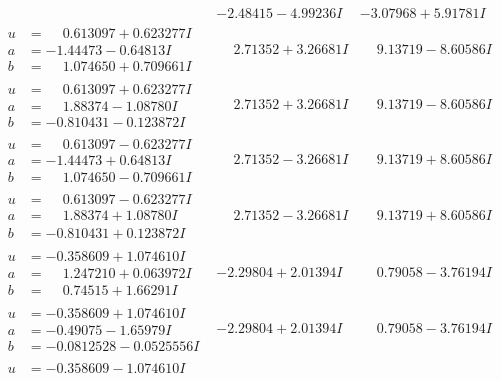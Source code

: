 \documentclass[1p]{elsarticle_modified}
\theoremstyle{definition}
\begin{document}
$$\begin{array}{c|c|c}
 & -2.48415 - 4.99236 I & -3.07968 + 5.91781 I \\ \hline\begin{aligned}
u &= \phantom{-}0.613097 + 0.623277 I \\
a &= -1.44473 - 0.64813 I \\
b &= \phantom{-}1.074650 + 0.709661 I\end{aligned}
 & \phantom{-}2.71352 + 3.26681 I & \phantom{-}9.13719 - 8.60586 I \\ \hline\begin{aligned}
u &= \phantom{-}0.613097 + 0.623277 I \\
a &= \phantom{-}1.88374 - 1.08780 I \\
b &= -0.810431 - 0.123872 I\end{aligned}
 & \phantom{-}2.71352 + 3.26681 I & \phantom{-}9.13719 - 8.60586 I \\ \hline\begin{aligned}
u &= \phantom{-}0.613097 - 0.623277 I \\
a &= -1.44473 + 0.64813 I \\
b &= \phantom{-}1.074650 - 0.709661 I\end{aligned}
 & \phantom{-}2.71352 - 3.26681 I & \phantom{-}9.13719 + 8.60586 I \\ \hline\begin{aligned}
u &= \phantom{-}0.613097 - 0.623277 I \\
a &= \phantom{-}1.88374 + 1.08780 I \\
b &= -0.810431 + 0.123872 I\end{aligned}
 & \phantom{-}2.71352 - 3.26681 I & \phantom{-}9.13719 + 8.60586 I \\ \hline\begin{aligned}
u &= -0.358609 + 1.074610 I \\
a &= \phantom{-}1.247210 + 0.063972 I \\
b &= \phantom{-}0.74515 + 1.66291 I\end{aligned}
 & -2.29804 + 2.01394 I & \phantom{-}0.79058 - 3.76194 I \\ \hline\begin{aligned}
u &= -0.358609 + 1.074610 I \\
a &= -0.49075 - 1.65979 I \\
b &= -0.0812528 - 0.0525556 I\end{aligned}
 & -2.29804 + 2.01394 I & \phantom{-}0.79058 - 3.76194 I \\ \hline\begin{aligned}
u &= -0.358609 - 1.074610 I \\

\end{aligned}
\end{array}$$
\end{document}

